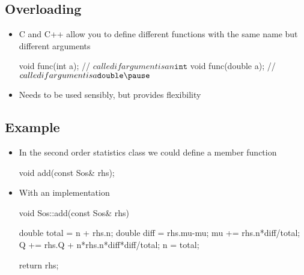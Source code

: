 \Outline

\begin{slide}
\section{Overloading}
  
\begin{PauseHighLight}
  \begin{itemize}
  \item C and C++ allow you to define different functions with the
    same name but different arguments
    \begin{cpp}
      void func(int a);     // $called if argument is an \texttt{int}$
      void func(double a);  // $called if argument is a \texttt{double}\pause$
    \end{cpp}
  \item Needs to be used sensibly, but provides flexibility\pause
  \end{itemize}
\end{PauseHighLight}

\end{slide}


\begin{slide}
\section[-1]{Example}

\begin{PauseHighLight}
  \begin{itemize}
  \item In the second order statistics class we could define a member
    function
    \begin{cpp}
      void add(const Sos& rhs);
    \end{cpp}
  \item With an implementation
    \begin{cpp}
void Sos::add(const Sos& rhs)
{
  double total = n + rhs.n;
  double diff = rhs.mu-mu;
  mu += rhs.n*diff/total;
  Q += rhs.Q + n*rhs.n*diff*diff/total;
  n = total;

  return rhs;
}
    \end{cpp}
  \end{itemize}
\end{PauseHighLight}

\end{slide}

